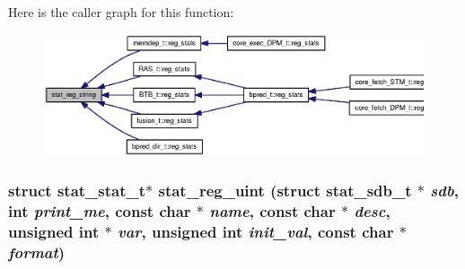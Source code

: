 Here is the caller graph for this function:\nopagebreak
\begin{figure}[H]
\begin{center}
\leavevmode
\includegraphics[width=317pt]{zesto_2stats_8h_c8c6f5229297787dbce204434f45acce_icgraph}
\end{center}
\end{figure}
\subsubsection[{stat\_\-reg\_\-uint}]{\setlength{\rightskip}{0pt plus 5cm}struct {\bf stat\_\-stat\_\-t}$\ast$ stat\_\-reg\_\-uint (struct {\bf stat\_\-sdb\_\-t} $\ast$ {\em sdb}, \/  int {\em print\_\-me}, \/  const char $\ast$ {\em name}, \/  const char $\ast$ {\em desc}, \/  unsigned int $\ast$ {\em var}, \/  unsigned int {\em init\_\-val}, \/  const char $\ast$ {\em format})\hspace{0.3cm}{\tt  [read]}}\label{zesto_2stats_8h_bc60b66d6bc63111e715425410f1156a}


